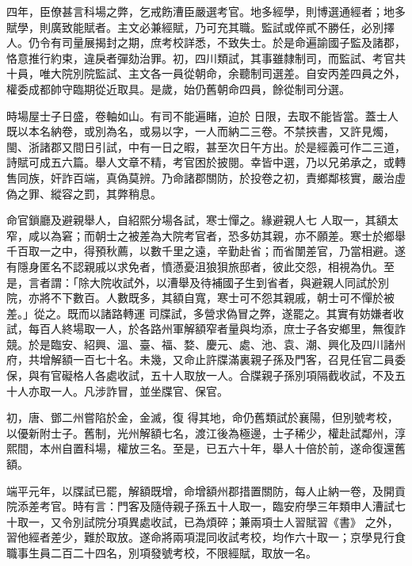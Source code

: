 \begin{pinyinscope}
 四年，臣僚甚言科場之弊，乞戒飭漕臣嚴選考官。地多經學，則博選通經者；地多
 賦學，則廣致能賦者。主文必兼經賦，乃可充其職。監試或倅貳不勝任，必別擇人。仍令有司量展揭封之期，庶考校詳悉，不致失士。於是命遍諭國子監及諸郡，恪意推行約束，違戾者彈劾治罪。初，四川類試，其事雖隸制司，而監試、考官共十員，唯大院別院監試、主文各一員從朝命，余聽制司選差。自安丙差四員之外，權委成都帥守臨期從近取具。是歲，始仍舊朝命四員，餘從制司分選。



 時場屋士子日盛，卷軸如山。有司不能遍睹，迫於
 日限，去取不能皆當。蓋士人既以本名納卷，或別為名，或易以字，一人而納二三卷。不禁挾書，又許見燭，閩、浙諸郡又間日引試，中有一日之暇，甚至次日午方出。於是經義可作二三道，詩賦可成五六篇。舉人文章不精，考官困於披閱。幸皆中選，乃以兄弟承之，或轉售同族，奸詐百端，真偽莫辨。乃命諸郡關防，於投卷之初，責鄉鄰核實，嚴治虛偽之罪、縱容之罰，其弊稍息。



 命官鎖廳及避親舉人，自紹熙分場各試，寒士憚之。緣避親人七
 人取一，其額太窄，咸以為窘；而朝士之被差為大院考官者，恐多妨其親，亦不願差。寒士於鄉舉千百取一之中，得預秋薦，以數千里之遠，辛勤赴省；而省闈差官，乃當相避。遂有隱身匿名不認親戚以求免者，憤懣憂沮狼狽旅邸者，彼此交怨，相視為仇。至是，言者謂：「除大院收試外，以漕舉及待補國子生到省者，與避親人同試於別院，亦將不下數百。人數既多，其額自寬，寒士可不怨其親戚，朝士可不憚於被差。」從之。既而以諸路轉運
 司牒試，多營求偽冒之弊，遂罷之。其實有妨嫌者收試，每百人終場取一人，於各路州軍解額窄者量與均添，庶士子各安鄉里，無復詐競。於是臨安、紹興、溫、臺、福、婺、慶元、處、池、袁、潮、興化及四川諸州府，共增解額一百七十名。未幾，又命止許牒滿裏親子孫及門客，召見任官二員委保，與有官礙格人各處收試，五十人取放一人。合牒親子孫別項隔截收試，不及五十人亦取一人。凡涉詐冒，並坐牒官、保官。



 初，唐、鄧二州嘗陷於金，金滅，復
 得其地，命仍舊類試於襄陽，但別號考校，以優新附士子。舊制，光州解額七名，渡江後為極邊，士子稀少，權赴試鄰州，淳熙間，本州自置科場，權放三名。至是，已五六十年，舉人十倍於前，遂命復還舊額。



 端平元年，以牒試已罷，解額既增，命增額州郡措置關防，每人止納一卷，及開貢院添差考官。時有言：門客及隨侍親子孫五十人取一，臨安府學三年類申人漕試七十取一，又令別試院分項異處收試，已為煩碎；兼兩項士人習賦習《書》
 之外，習他經者差少，難於取放。遂命將兩項混同收試考校，均作六十取一；京學見行食職事生員二百二十四名，別項發號考校，不限經賦，取放一名。




\end{pinyinscope}
